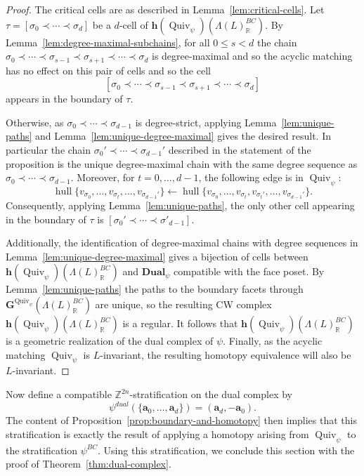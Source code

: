 \documentclass{amsart}
\newcommand{\ZZ}{\mathbb{Z}}
\newcommand{\RR}{\mathbb{R}}
\newcommand{\homotopy}{\mathbf{h}}
\newcommand{\graph}{\mathbf{G}}
\newcommand{\Dual}{\mathbf{Dual}}
\newcommand{\Quiv}{\operatorname{Quiv}}
\DeclareMathOperator{\hull}{hull}
\theoremstyle{remark}
\begin{document}
\begin{proof}
  The critical cells are as described in Lemma~\ref{lem:critical-cells}. Let $\tau = [\sigma_0\prec \cdots \prec \sigma_d]$ be a $d$-cell of $\homotopy(\Quiv_\psi)(\Lambda(L)_{\RR}^{BC})$. By Lemma~\ref{lem:degree-maximal-subchains}, for all $0\leq s< d$ the chain $\sigma_0\prec \cdots\prec \sigma_{s-1}\prec \sigma_{s+1}\prec \cdots \prec \sigma_d$ is degree-maximal and so the acyclic matching has no effect on this pair of cells and so the cell \[[\sigma_0\prec \cdots\prec \sigma_{s-1}\prec \sigma_{s+1}\prec \cdots \prec \sigma_d]\] appears in the boundary of $\tau$.

  Otherwise, as $\sigma_0\prec \cdots \prec \sigma_{d-1}$ is degree-strict, applying Lemma~\ref{lem:unique-paths} and Lemma~\ref{lem:unique-degree-maximal} gives the desired result. In particular the chain $\sigma_0'\prec \cdots \prec \sigma_{d-1}'$ described in the statement of the proposition is the unique degree-maximal chain with the same degree sequence as $\sigma_0\prec \cdots \prec \sigma_{d-1}$. Moreover, for $t=0,\ldots,d-1$, the following edge is in $\Quiv_\psi$:
  \[\hull \{ v_{\sigma_0}, \ldots,v_{\sigma_{t}},\ldots,v_{\sigma_{d-1}'}\} \leftarrow
  \hull \{ v_{\sigma_0}, \ldots,v_{\sigma_{t}},v_{\sigma_{t}'},\ldots,v_{\sigma_{d-1}'}\}.
  \]
  Consequently, applying Lemma~\ref{lem:unique-paths}, the only other cell appearing in the boundary of $\tau$ is $[\sigma_0'\prec \cdots \prec \sigma'_{d-1}]$.
  
  Additionally, the identification of degree-maximal chains with degree sequences in Lemma~\ref{lem:unique-degree-maximal} gives a bijection of cells between
  $\homotopy(\Quiv_\psi)(\Lambda(L)_{\RR}^{BC})$ and $\Dual_{\psi}$ compatible with the face poset.
  By Lemma~\ref{lem:unique-paths} the paths to the boundary facets through $\graph^{\Quiv_\psi}(\Lambda(L)_{\RR}^{BC})$ are unique,
  so the resulting CW complex $\homotopy(\Quiv_\psi)(\Lambda(L)_{\RR}^{BC})$ is a regular.
  It follows that $\homotopy(\Quiv_\psi)(\Lambda(L)_{\RR}^{BC})$ is a geometric realization of the dual complex of $\psi$.
  Finally, as the acyclic matching $\Quiv_\psi$ is $L$-invariant, the resulting homotopy equivalence will also be $L$-invariant.
\end{proof}

Now define a compatible $\ZZ^{2n}$-stratification on the dual complex by
\[\psi^{dual}(\{\bm{a}_0,\ldots,\bm{a}_d\}) = (\bm{a}_d,-\bm{a}_0).\]
The content of Proposition~\ref{prop:boundary-and-homotopy} then implies that this stratification is exactly the result of applying a homotopy arising from $\Quiv_\psi$ to the stratification $\psi^{BC}$.
Using this stratification, we conclude this section with the proof of Theorem~\ref{thm:dual-complex}.
\end{document}

